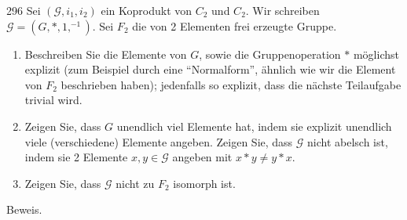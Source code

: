 \begin{algebraUE}{296}
Sei $(\mathcal{G},i_1,i_2)$ ein Koprodukt von $C_2$ und $C_2$. Wir schreiben
$\mathcal{G} = (G,\ast,1,^{-1})$. Sei $F_2$ die von 2 Elementen frei erzeugte Gruppe.
\begin{enumerate}
  \item Beschreiben Sie die Elemente von $G$, sowie die Gruppenoperation $\ast$
  möglichst explizit (zum Beispiel durch eine ``Normalform'', ähnlich wie wir
  die Element von $F_2$ beschrieben haben); jedenfalls so explizit, dass die
  nächste Teilaufgabe trivial wird.
  \item Zeigen Sie, dass $G$ unendlich viel Elemente hat, indem sie explizit
  unendlich viele (verschiedene) Elemente angeben. Zeigen Sie, dass $\mathcal{G}$
  nicht abelsch ist, indem sie 2 Elemente $x,y \in \mathcal{G}$ angeben mit
  $x \ast y \neq y \ast x$.
  \item Zeigen Sie, dass $\mathcal{G}$ nicht zu $F_2$ isomorph ist.
\end{enumerate}
\end{algebraUE}
\begin{solution}
Beweis.
\end{solution}

